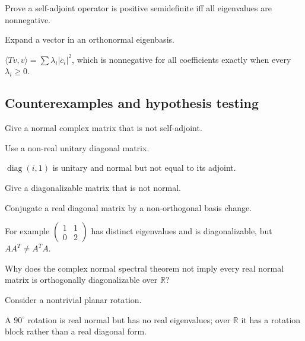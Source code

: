\begin{exercise}\label{exr:i16-expand-09}
Prove a self-adjoint operator is positive semidefinite iff all eigenvalues are nonnegative.
\end{exercise}
\begin{hint}
Expand a vector in an orthonormal eigenbasis.
\end{hint}
\begin{solution}
\(\langle Tv,v\rangle=\sum\lambda_i|c_i|^2\), which is nonnegative for all coefficients exactly when every \(\lambda_i\ge0\).
\end{solution}

\subsection*{Counterexamples and hypothesis testing}

\begin{exercise}\label{exr:i16-expand-10}
Give a normal complex matrix that is not self-adjoint.
\end{exercise}
\begin{hint}
Use a non-real unitary diagonal matrix.
\end{hint}
\begin{solution}
\(\operatorname{diag}(i,1)\) is unitary and normal but not equal to its adjoint.
\end{solution}

\begin{exercise}\label{exr:i16-expand-11}
Give a diagonalizable matrix that is not normal.
\end{exercise}
\begin{hint}
Conjugate a real diagonal matrix by a non-orthogonal basis change.
\end{hint}
\begin{solution}
For example \(\begin{pmatrix}1&1\\0&2\end{pmatrix}\) has distinct eigenvalues and is diagonalizable, but \(AA^T\ne A^TA\).
\end{solution}

\begin{exercise}\label{exr:i16-expand-12}
Why does the complex normal spectral theorem not imply every real normal matrix is orthogonally diagonalizable over \(\mathbb R\)?
\end{exercise}
\begin{hint}
Consider a nontrivial planar rotation.
\end{hint}
\begin{solution}
A \(90^\circ\) rotation is real normal but has no real eigenvalues; over \(\mathbb R\) it has a rotation block rather than a real diagonal form.
\end{solution}

